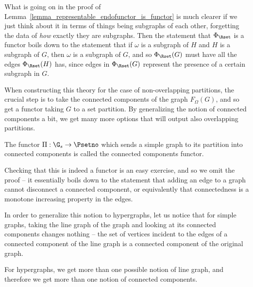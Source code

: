 \documentclass[a4paper,reqno,oneside]{article} %
\begin{document}
What is going on in the proof of Lemma~\ref{lemma_representable_endofunctor_is_functor} is much clearer if we just think about it in terms of things being subgraphs of each other, forgetting the data of \emph{how} exactly they are subgraphs. Then the statement that $\Phi_\Rset$ is a functor boils down to the statement that if $\omega$ is a subgraph of $H$ and $H$ is a subgraph of $G$, then $\omega$ is a subgraph of $G$, and so $\Phi_\Rset(G)$ must have all the edges $\Phi_\Rset(H)$ has, since edges in $\Phi_\Rset(G)$ represent the presence of a certain subgraph in $G$.

When constructing this theory for the case of non-overlapping partitions, the crucial step is to take the connected components of the graph $F_\Omega(G)$, and so get a functor taking $G$ to a set partition. By generalizing the notion of connected components a bit, we get many more options that will output also overlapping partitions.

\begin{definition}
    The functor $\Pi: \G_s \to \Psetno$ which sends a simple graph to its partition into connected components is called the connected components functor.
\end{definition}

Checking that this is indeed a functor is an easy exercise, and so we omit the proof -- it essentially boils down to the statement that adding an edge to a graph cannot disconnect a connected component, or equivalently that connectedness is a monotone increasing property in the edges.

In order to generalize this notion to hypergraphs, let us notice that for simple graphs, taking the line graph of the graph and looking at its connected components changes nothing -- the set of vertices incident to the edges of a connected component of the line graph is a connected component of the original graph.

For hypergraphs, we get more than one possible notion of line graph, and therefore we get more than one notion of connected components.
\end{document}
